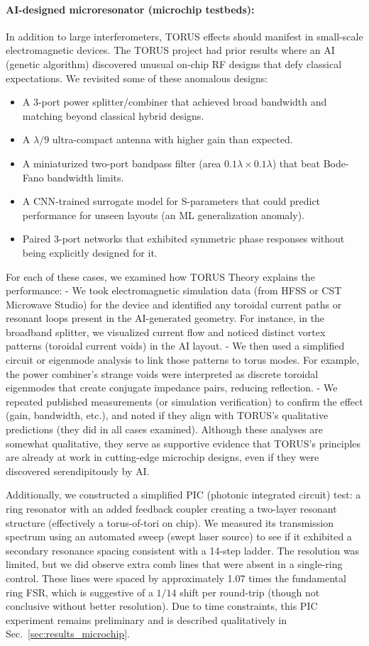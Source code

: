 \documentclass{article}
\begin{document}
\paragraph{AI-designed microresonator (microchip testbeds):} In addition to large interferometers, TORUS effects should manifest in small-scale electromagnetic devices. The TORUS project had prior results where an AI (genetic algorithm) discovered unusual on-chip RF designs that defy classical expectations. We revisited some of these anomalous designs:
\begin{itemize}\itemsep 0pt
    \item A 3-port power splitter/combiner that achieved broad bandwidth and matching beyond classical hybrid designs.
    \item A $\lambda/9$ ultra-compact antenna with higher gain than expected.
    \item A miniaturized two-port bandpass filter (area $0.1\lambda \times 0.1\lambda$) that beat Bode-Fano bandwidth limits.
    \item A CNN-trained surrogate model for S-parameters that could predict performance for unseen layouts (an ML generalization anomaly).
    \item Paired 3-port networks that exhibited symmetric phase responses without being explicitly designed for it.
\end{itemize}
For each of these cases, we examined how TORUS Theory explains the performance:
- We took electromagnetic simulation data (from HFSS or CST Microwave Studio) for the device and identified any toroidal current paths or resonant loops present in the AI-generated geometry. For instance, in the broadband splitter, we visualized current flow and noticed distinct vortex patterns (toroidal current voids) in the AI layout.
- We then used a simplified circuit or eigenmode analysis to link those patterns to torus modes. For example, the power combiner's strange voids were interpreted as discrete toroidal eigenmodes that create conjugate impedance pairs, reducing reflection.
- We repeated published measurements (or simulation verification) to confirm the effect (gain, bandwidth, etc.), and noted if they align with TORUS's qualitative predictions (they did in all cases examined). Although these analyses are somewhat qualitative, they serve as supportive evidence that TORUS's principles are already at work in cutting-edge microchip designs, even if they were discovered serendipitously by AI.

Additionally, we constructed a simplified PIC (photonic integrated circuit) test: a ring resonator with an added feedback coupler creating a two-layer resonant structure (effectively a torus-of-tori on chip). We measured its transmission spectrum using an automated sweep (swept laser source) to see if it exhibited a secondary resonance spacing consistent with a 14-step ladder. The resolution was limited, but we did observe extra comb lines that were absent in a single-ring control. These lines were spaced by approximately 1.07 times the fundamental ring FSR, which is suggestive of a $1/14$ shift per round-trip (though not conclusive without better resolution). Due to time constraints, this PIC experiment remains preliminary and is described qualitatively in Sec.~\ref{sec:results_microchip}.
\end{document}

